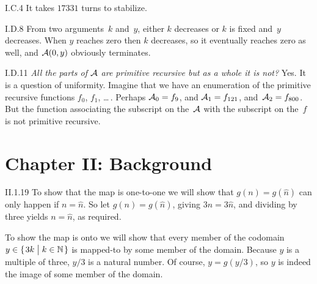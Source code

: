 %
%
%
%
%
%
%
%
%
%
\begin{ans}{I.C.4}
It takes $17331$ turns to stabilize.
\end{ans}
%
%
%
%
%
\begin{ans}{I.D.8}
From two arguments~$k$ and~$y$, either $k$ decreases or
$k$ is fixed and~$y$ decreases.
When $y$ reaches zero
then $k$ decreases, so it eventually reaches zero as well, and
$\mathcal{A}(0,y)$ obviously terminates.
\end{ans}
%
%
%
\begin{ans}{I.D.11}
\textit{All the parts of $\mathcal{A}$ are primitive
recursive but as a whole it is not?}
Yes.  It is a question of uniformity.
Imagine that we have an enumeration of the primitive recursive functions
$f_0$, $f_1$, \ldots\,.
Perhaps $\mathcal{A}_0=f_9$, and $\mathcal{A}_1=f_{121}$,
and~$\mathcal{A}_2=f_{800}$.
But the function associating the subscript on the~$\mathcal{A}$ with the
subscript on the~$f$ is not primitive recursive.
\end{ans}
%
%
%
%
%
%
%
\protect \chapter {Chapter II: Background}
%
\begin{ans}{II.1.19}
To show that the map is one-to-one we will show that $g(n)=g(\hat{n})$ can only
happen if $n=\hat{n}$.
So let $g(n)=g(\hat{n})$, giving $3n=3\hat{n}$, and dividing by three
yields $n=\hat{n}$, as required.

To show the map is onto we will show that every member of the codomain
$y\in\set{3k\suchthat k\in\N}$ is mapped-to by some member of the domain.
Because $y$ is a multiple of three, $y/3$ is a natural number.
Of course, $y=g(y/3)$, so $y$ is indeed the image of some member of the
domain.
\end{ans}
